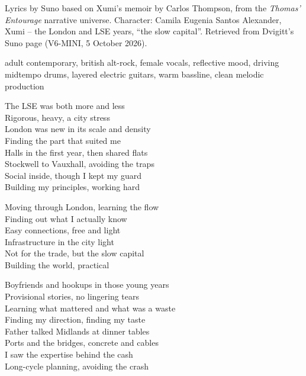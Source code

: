 
\begin{notes}
Lyrics by Suno based on Xumi's memoir by Carlos Thompson, from the \emph{Thomas’ Entourage} narrative universe. Character: Camila Eugenia Santos Alexander, Xumi -- the London and LSE years, ``the slow capital''. Retrieved from Dvigitt's Suno page (V6-MINI, 5 October 2026).
\end{notes}
\begin{style}
adult contemporary, british alt-rock, female vocals, reflective mood, driving midtempo drums, layered electric guitars, warm bassline, clean melodic production
\end{style}
\begin{lyrics}
The LSE was both more and less\\
Rigorous, heavy, a city stress\\
London was new in its scale and density\\
Finding the part that suited me\\
Halls in the first year, then shared flats\\
Stockwell to Vauxhall, avoiding the traps\\
Social inside, though I kept my guard\\
Building my principles, working hard

Moving through London, learning the flow\\
Finding out what I actually know\\
Easy connections, free and light\\
Infrastructure in the city light\\
Not for the trade, but the slow capital\\
Building the world, practical

Boyfriends and hookups in those young years\\
Provisional stories, no lingering tears\\
Learning what mattered and what was a waste\\
Finding my direction, finding my taste\\
Father talked Midlands at dinner tables\\
Ports and the bridges, concrete and cables\\
I saw the expertise behind the cash\\
Long-cycle planning, avoiding the crash


\end{lyrics}
